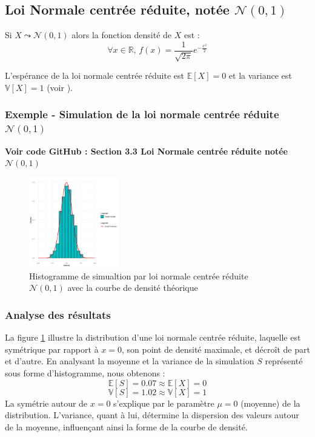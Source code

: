     \subsection{Loi Normale centrée réduite, notée $\mathcal{N}(0,1)$}
        Si $X\leadsto\mathcal N(0,1)$ alors la fonction densité de $X$ est :
        \begin{equation}
            \forall x\in\mathbb R,\, f(x)= \dfrac{1}{\sqrt{2\pi}}e^{-\frac{x^2}{2}}
        \end{equation}

        L'espérance de la loi normale centrée réduite est $\mathbb{E}[X]=0$ et la variance est $\mathbb{V}[X]=1$ (voir \cite{loi_normale}).

        \subsubsection{Exemple - Simulation de la loi normale centrée réduite $\mathcal N(0,1)$}
        \textbf{Voir code GitHub \cite{git} : Section 3.3 Loi Normale centrée réduite notée $\mathcal N(0,1)$}
        \begin{figure}[H]
            \centering
            \includegraphics[width=0.35\textwidth]{4_attachments/figures/output10.png}
            \caption{Histogramme de simualtion par loi normale centrée réduite $\mathcal N(0,1)$ avec la courbe de densité théorique}
            \label{fig:histogramme_normale_01}
        \end{figure}

        \subsubsection{Analyse des résultats}
            La figure \ref{fig:histogramme_normale_01} illustre la distribution d'une loi normale centrée réduite, laquelle est symétrique par rapport à $x=0$, son point de densité maximale, et décroît de part et d'autre. 
            En analysant la moyenne et la variance de la simulation $S$ représenté sous forme d'histogramme, nous obtenons :
            \[
                \mathbb{E}[S] = 0.07 \approx \mathbb{E}[X] = 0
                \]
                \[
                \mathbb{V}[S] = 1.02 \approx \mathbb{V}[X] = 1
            \]
            La symétrie autour de $x=0$ s'explique par le paramètre $\mu=0$ (moyenne) de la distribution. L'variance, quant à lui, détermine la dispersion des valeurs autour de la moyenne, influençant ainsi la forme de la courbe de densité.

